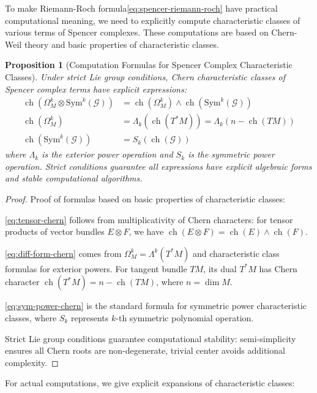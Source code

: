 \documentclass[a4paper,12pt]{extarticle}
\newtheorem{proposition}[theorem]{Proposition}
\newcommand{\ch}{\operatorname{ch}}
\theoremstyle{definition}
\begin{document}
To make Riemann-Roch formula\eqref{eq:spencer-riemann-roch} have practical computational meaning, we need to explicitly compute characteristic classes of various terms of Spencer complexes. These computations are based on Chern-Weil theory\cite{chern1944characteristic} and basic properties of characteristic classes.

\begin{proposition}[Computation Formulas for Spencer Complex Characteristic Classes]
Under strict Lie group conditions, Chern characteristic classes of Spencer complex terms have explicit expressions:
\begin{align}
\ch(\Omega^k_M \otimes \mathrm{Sym}^k(\mathcal{G})) &= \ch(\Omega^k_M) \wedge \ch(\mathrm{Sym}^k(\mathcal{G})) \label{eq:tensor-chern}\\
\ch(\Omega^k_M) &= \Lambda_k(\ch(T^*M)) = \Lambda_k(n - \ch(TM)) \label{eq:diff-form-chern}\\
\ch(\mathrm{Sym}^k(\mathcal{G})) &= S_k(\ch(\mathcal{G})) \label{eq:sym-power-chern}
\end{align}
where $\Lambda_k$ is the exterior power operation and $S_k$ is the symmetric power operation\cite{fulton1998intersection}. Strict conditions guarantee all expressions have explicit algebraic forms and stable computational algorithms.
\end{proposition}

\begin{proof}
Proof of formulas based on basic properties of characteristic classes:

\eqref{eq:tensor-chern} follows from multiplicativity of Chern characters\cite{milnor1974characteristic}: for tensor products of vector bundles $E \otimes F$, we have $\ch(E \otimes F) = \ch(E) \wedge \ch(F)$.

\eqref{eq:diff-form-chern} comes from $\Omega^k_M = \Lambda^k(T^*M)$ and characteristic class formulas for exterior powers. For tangent bundle $TM$, its dual $T^*M$ has Chern character $\ch(T^*M) = n - \ch(TM)$, where $n = \dim M$.

\eqref{eq:sym-power-chern} is the standard formula for symmetric power characteristic classes, where $S_k$ represents $k$-th symmetric polynomial operation.

Strict Lie group conditions guarantee computational stability: semi-simplicity ensures all Chern roots are non-degenerate, trivial center avoids additional complexity.
\end{proof}

For actual computations, we give explicit expansions of characteristic classes:
\end{document}
